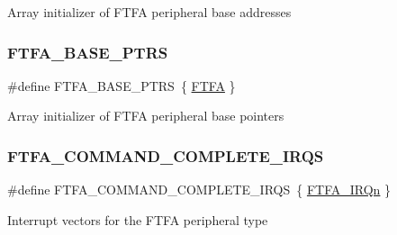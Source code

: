 Array initializer of F\+T\+FA peripheral base addresses \mbox{\label{group___f_t_f_a___peripheral___access___layer_ga3f06770a713a2c02c4eec6b98daefd7e}} 
\subsubsection{\texorpdfstring{FTFA\_BASE\_PTRS}{FTFA\_BASE\_PTRS}}
{\footnotesize\ttfamily \#define F\+T\+F\+A\+\_\+\+B\+A\+S\+E\+\_\+\+P\+T\+RS~\{ \mbox{\hyperlink{group___f_t_f_a___peripheral___access___layer_ga51932e698139405f75ed323a8bc0bbb8}{F\+T\+FA}} \}}

Array initializer of F\+T\+FA peripheral base pointers \mbox{\label{group___f_t_f_a___peripheral___access___layer_ga2038132a82db8c41df57436b93a52911}} 
\subsubsection{\texorpdfstring{FTFA\_COMMAND\_COMPLETE\_IRQS}{FTFA\_COMMAND\_COMPLETE\_IRQS}}
{\footnotesize\ttfamily \#define F\+T\+F\+A\+\_\+\+C\+O\+M\+M\+A\+N\+D\+\_\+\+C\+O\+M\+P\+L\+E\+T\+E\+\_\+\+I\+R\+QS~\{ \mbox{\hyperlink{group___interrupt__vector__numbers_gga666eb0caeb12ec0e281415592ae89083a48ae373dabf0b833defec3f0c5f0e029}{F\+T\+F\+A\+\_\+\+I\+R\+Qn}} \}}

Interrupt vectors for the F\+T\+FA peripheral type 